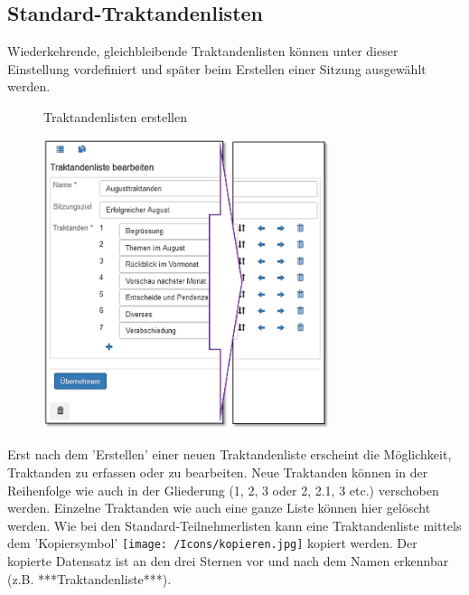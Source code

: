 \clearpage
\subsection{Standard-Traktandenlisten}

Wiederkehrende, gleichbleibende Traktandenlisten können unter dieser Einstellung vordefiniert und später beim Erstellen einer Sitzung ausgewählt werden.

\begin{figure}[H]
\caption{Traktandenlisten erstellen}
\end{figure}

\begin{figure}
\vspace{-15pt}
\includegraphics[height=85mm]{../chapters/13_Konfigurationen/pictures/13-10_TraktandenlistenBearbeiten.jpg}
\end{figure}

Erst nach dem 'Erstellen' einer neuen Traktandenliste erscheint die Möglichkeit, Traktanden zu erfassen oder zu bearbeiten. Neue Traktanden können in der Reihenfolge wie auch in der Gliederung (1, 2, 3 oder 2, 2.1, 3 etc.) verschoben werden. Einzelne Traktanden wie auch eine ganze Liste können hier gelöscht werden. Wie bei den Standard-Teilnehmerlisten kann eine Traktandenliste mittels dem 'Kopiersymbol' \texttt{[image: /Icons/kopieren.jpg]} kopiert werden. Der kopierte Datensatz ist an den drei Sternen vor und nach dem Namen erkennbar (z.B. ***Traktandenliste***). 


